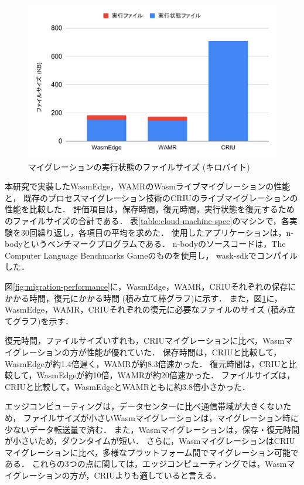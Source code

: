 \begin{figure}[t]
    \centering
    \includegraphics*[width=1\linewidth]{images/migration_file_size}
    \caption{マイグレーションの実行状態のファイルサイズ (キロバイト)}
    \label{fig:migration-file-size}
\end{figure}

本研究で実装したWasmEdge，WAMRのWasmライブマイグレーションの性能と，
既存のプロセスマイグレーション技術のCRIUのライブマイグレーションの性能を比較した．
評価項目は，保存時間，復元時間，実行状態を復元するためのファイルサイズの合計である．
表\ref{table:cloud-machine-spec}のマシンで，各実験を30回繰り返し，各項目の平均を求めた．
使用したアプリケーションは，n-bodyというベンチマークプログラムである．
n-bodyのソースコードは，The Computer Language Benchmarks Gameのものを使用し，
wask-sdkでコンパイルした．

図\ref{fig:migration-performance}に，WasmEdge，WAMR，CRIUそれぞれの保存にかかる時間，復元にかかる時間 (積み立て棒グラフ)に示す．
また，図\ref{fig:migration-file-size}に，WasmEdge，WAMR，CRIUそれぞれの復元に必要なファイルのサイズ (積み立てグラフ)を示す．

復元時間，ファイルサイズいずれも，CRIUマイグレーションに比べ，Wasmマイグレーションの方が性能が優れていた．
保存時間は，CRIUと比較して，WasmEdgeが約1.4倍遅く，WAMRが約8.3倍速かった．
復元時間は，CRIUと比較して，WasmEdgeが約10倍，WAMRが約20倍速かった．
ファイルサイズは，CRIUと比較して，WasmEdgeとWAMRともに約3.8倍小さかった．

エッジコンピューティングは，データセンターに比べ通信帯域が大きくないため，
ファイルサイズが小さいWasmマイグレーションは，マイグレーション時に少ないデータ転送量で済む．
また，Wasmマイグレーションは，保存・復元時間が小さいため，ダウンタイムが短い．
さらに，WasmマイグレーションはCRIUマイグレーションに比べ，多様なプラットフォーム間でマイグレーション可能である．
これらの3つの点に関しては，エッジコンピューティングでは，Wasmマイグレーションの方が，CRIUよりも適していると言える．



